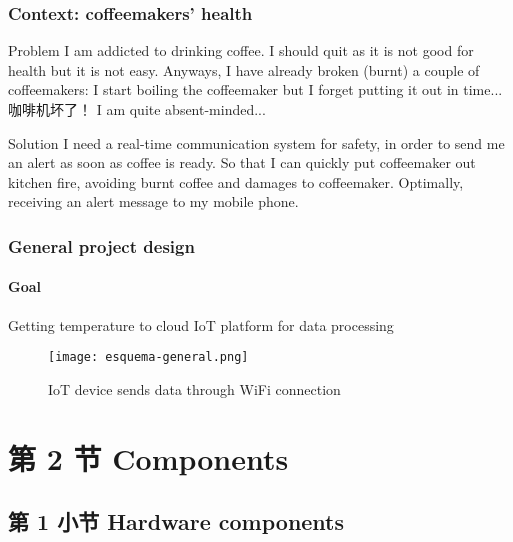 \documentclass[
    aspectratio=169,                   %
]{beamer}
\begin{document}
    \begin{frame}
        \frametitle{Context: coffeemakers' health}

        \begin{block}{Problem}
            I am addicted to drinking coffee. I should quit as it is not good for health but it is not easy. Anyways, I have already broken (burnt) a couple of coffeemakers: I start boiling the coffeemaker but I forget putting it out in time... 咖啡机坏了！ I am quite absent-minded...
        \end{block}

        \begin{block}{Solution}
            I need a real-time communication system for safety, in order to send me an alert as soon as coffee is ready. So that I can quickly put coffeemaker out kitchen fire, avoiding burnt coffee and damages to coffeemaker. Optimally, receiving an alert message to my mobile phone.
        \end{block}

    \end{frame}

    \begin{frame}
        \frametitle{General project design}

        \paragraph{Goal} Getting temperature to cloud IoT platform for data processing

        \begin{figure}
            \centering
            \begin{stampbox}
                \texttt{[image: esquema-general.png]}
            \end{stampbox}
            \caption{IoT device sends data through WiFi connection}
        \end{figure}

    \end{frame}

\section{第 2 节 Components}

\subsection{第 1 小节 Hardware components}
\end{document}
